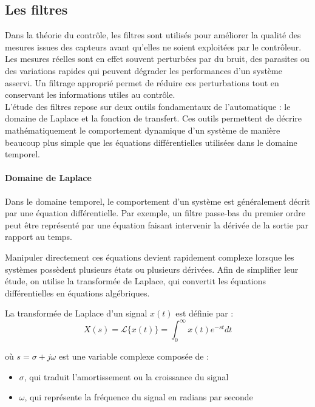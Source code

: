 \subsection{Les filtres}
\label{sec:filtres}

Dans la théorie du contrôle, les filtres sont utilisés pour améliorer la qualité des mesures issues des capteurs avant qu'elles ne soient exploitées par le contrôleur. Les mesures réelles sont en effet souvent perturbées par du bruit, des parasites ou des variations rapides qui peuvent dégrader les performances d'un système asservi. Un filtrage approprié permet de réduire ces perturbations tout en conservant les informations utiles au contrôle. \\

L'étude des filtres repose sur deux outils fondamentaux de l'automatique : le domaine de Laplace et la fonction de transfert. Ces outils permettent de décrire mathématiquement le comportement dynamique d'un système de manière beaucoup plus simple que les équations différentielles utilisées dans le domaine temporel. \\

\paragraph{Domaine de Laplace}

Dans le domaine temporel, le comportement d'un système est généralement décrit par une équation différentielle. Par exemple, un filtre passe-bas du premier ordre peut être représenté par une équation faisant intervenir la dérivée de la sortie par rapport au temps. 

Manipuler directement ces équations devient rapidement complexe lorsque les systèmes possèdent plusieurs états ou plusieurs dérivées. Afin de simplifier leur étude, on utilise la transformée de Laplace, qui convertit les équations différentielles en équations algébriques.

La transformée de Laplace d'un signal $x(t)$ est définie par :
\begin{equation}
    X(s) = \mathcal{L}\{x(t)\} = \int_{0}^{\infty} x(t) e^{-st} dt
\end{equation}

où $s = \sigma + j\omega$ est une variable complexe composée de :
\begin{itemize}
    \item $\sigma$, qui traduit l'amortissement ou la croissance du signal
    \item $\omega$, qui représente la fréquence du signal en radians par seconde
\end{itemize}

